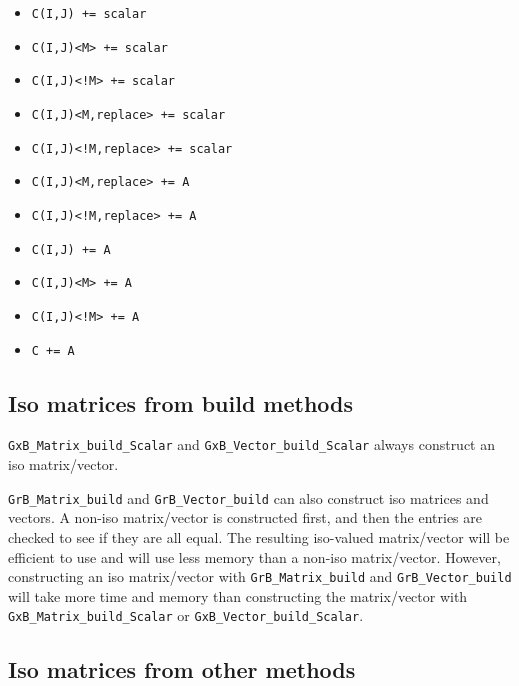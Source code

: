 \documentclass[12pt]{article}
\begin{document}
{\begin{itemize}
                \begin{itemize}
                \item \verb'C(I,J) += scalar'
                \item \verb'C(I,J)<M> += scalar'
                \item \verb'C(I,J)<!M> += scalar'
                \item \verb'C(I,J)<M,replace> += scalar'
                \item \verb'C(I,J)<!M,replace> += scalar'
                \item \verb'C(I,J)<M,replace> += A'
                \item \verb'C(I,J)<!M,replace> += A'
                \item \verb'C(I,J) += A'
                \item \verb'C(I,J)<M> += A'
                \item \verb'C(I,J)<!M> += A '
                \item \verb'C += A'
                \end{itemize}
\end{itemize}

\subsection{Iso matrices from build methods}
\label{iso_build}

\verb'GxB_Matrix_build_Scalar' and \verb'GxB_Vector_build_Scalar'
always construct an iso matrix/vector.

\verb'GrB_Matrix_build' and \verb'GrB_Vector_build' can also construct iso
matrices and vectors.  A non-iso matrix/vector is constructed first, and then
the entries are checked to see if they are all equal.  The resulting iso-valued
matrix/vector will be efficient to use and will use less memory than a non-iso
matrix/vector.  However, constructing an iso matrix/vector with
\verb'GrB_Matrix_build' and \verb'GrB_Vector_build' will take more time
and memory than constructing the matrix/vector with
\verb'GxB_Matrix_build_Scalar' or \verb'GxB_Vector_build_Scalar'.

\subsection{Iso matrices from other methods}
\label{iso_other}

}
\end{document}
